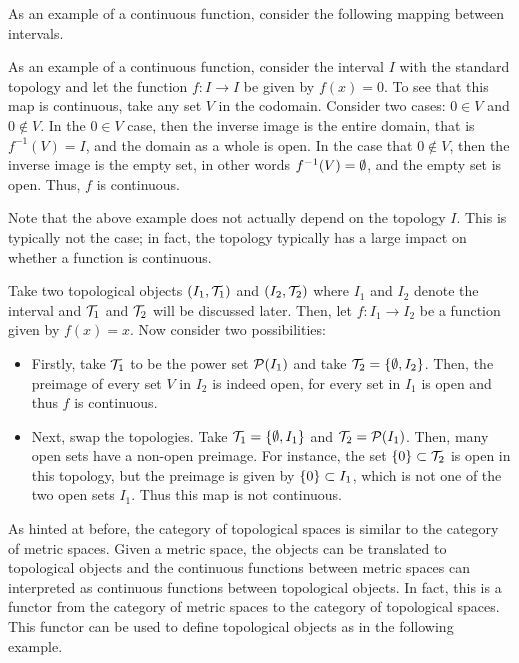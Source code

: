 \documentclass[../sean_thesis.tex]{subfiles}
\begin{document}
As an example of a continuous function, consider the following mapping between intervals.

\begin{example}
	As an example of a continuous function, consider the interval $I$ with the standard topology and let the function $f: I \to I$ be given by $f(x) = 0$. To see that this map is continuous, take any set $V$ in the codomain. Consider two cases: $0 \in V$ and $0 \not\in V$. In the $0 \in V$ case, then the inverse image is the entire domain, that is $f^{-1}(V) = I$, and the domain as a whole is open. In the case that $0 \not\in V$, then the inverse image is the empty set, in other words $f^{-1}(V) = \emptyset$, and the empty set is open. Thus, $f$ is continuous.
\end{example}

Note that the above example does not actually depend on the topology $I$. This is typically not the case; in fact, the topology typically has a large impact on whether a function is continuous.

\begin{example}
\label{ex:cnts_and_top}
	Take two topological objects $(I_1, \mathcal{T}_1)$ and $(I_2, \mathcal{T}_2)$ where $I_1$ and $I_2$ denote the interval and $\mathcal{T}_1$ and $\mathcal{T}_2$ will be discussed later. Then, let $f: I_1 \to I_2$ be a function given by $f(x) = x$. Now consider two possibilities:
	\vspace{-\parskip}
	\begin{itemize}
		\item Firstly, take $\mathcal{T}_1$ to be the power set $\mathcal{P} (I_1)$ and take $\mathcal{T}_2 = \left\{\emptyset, I_2\right\}$. Then, the preimage of every set $V$ in $I_2$ is indeed open, for every set in $I_1$ is open and thus $f$ is continuous.
		\item Next, swap the topologies. Take $\mathcal{T}_1 = \left\{\emptyset, I_1\right\}$ and $\mathcal{T}_2 = \mathcal{P} (I_1)$. Then, many open sets have a non-open preimage. For instance, the set $\left\{0\right\} \subset \mathcal{T}_2$ is open in this topology, but the preimage is given by $\left\{0\right\} \subset I_1$, which is not one of the two open sets $I_1$. Thus this map is not continuous.
	\end{itemize}
\end{example}

As hinted at before, the category of topological spaces is similar to the category of metric spaces. Given a metric space, the objects can be translated to topological objects and the continuous functions between metric spaces can interpreted as continuous functions between topological objects. In fact, this is a functor from the category of metric spaces to the category of topological spaces. This functor can be used to define topological objects as in the following example. 
\end{document}
